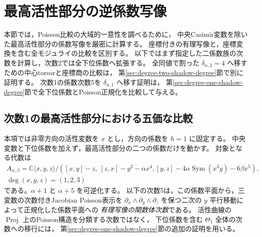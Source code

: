 \section{最高活性部分の逆係数写像}
\label{sec:shadow-top-inverse}

本節では，Poisson比較の大域的一意性を調べるために，
中央Casimir変数を除いた最高活性部分の係数写像を厳密に計算する。
座標付きの有理写像と，座標変換を含む全モジュライの比較を区別する。
以下ではまず指定した二係数族の次数を計算し，次数2では全下位係数へ拡張する。
全同値で割った $\delta_{n,2}=4$ へ移すための中心torsorと座標商の比較は，
第\ref{sec:degree-two-shadow-degree}節で別に証明する。
次数1の係数次数5を $\delta_{n,1}$ へ移す証明は，
第\ref{sec:degree-one-shadow-degree}節で全下位係数とPoisson正規化を比較して与える。

\subsection{次数1の最高活性部分における五価な比較}
\label{sec:degree-one-shadow-top-inverse}

本項では非零方向の活性変数を $x$ とし，方向の係数を $h=1$ に固定する。
中央変数と下位係数を加えず，最高活性部分の二つの係数だけを動かす。
対象となる代数は
\begin{equation}
\label{eq:degree-one-shadow-top-algebra}
 \begin{gathered}
 A_{\alpha,\beta}=
 \mathbb C\langle x,y,z\rangle/
 \left([x,y]-z,\ [z,x]-y^2-\alpha x^4,
       [y,z]-4\alpha\operatorname{Sym}(x^3y)-6\beta x^5\right),\\
 \deg(x,y,z)=(1,2,3)
 \end{gathered}
\end{equation}
である。$\alpha+1$ と $\alpha+5$ を可逆化する。
以下の次数5は，この係数平面から，三変数の次数付きJacobian Poisson表示を
$\partial_x\wedge\partial_y\wedge\partial_z$ を保つ二次の $y$ 平行移動によって正規化した係数平面への
\emph{有理写像の関数体次数}である。
活性曲線の $\operatorname{Proj}$ 上のPoisson構造を分類する次数ではなく，
下位係数を含む $\Theta_1$ 全体の次数への移行には，
第\ref{sec:degree-one-shadow-degree}節の追加の証明を用いる。

